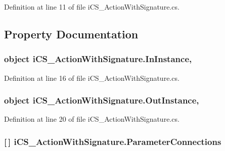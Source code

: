 Definition at line 11 of file i\+C\+S\+\_\+\+Action\+With\+Signature.\+cs.



\subsection{Property Documentation}
\hypertarget{classi_c_s___action_with_signature_a5197b643c6f412b39367e35d2d3ee346}{
\subsubsection[{In\+Instance}]{\setlength{\rightskip}{0pt plus 5cm}object i\+C\+S\+\_\+\+Action\+With\+Signature.\+In\+Instance\hspace{0.3cm}{\ttfamily [get]}, {\ttfamily [set]}}}\label{classi_c_s___action_with_signature_a5197b643c6f412b39367e35d2d3ee346}


Definition at line 16 of file i\+C\+S\+\_\+\+Action\+With\+Signature.\+cs.

\hypertarget{classi_c_s___action_with_signature_a04da5cdc43cc8a65dd2f21d4807144fe}{
\subsubsection[{Out\+Instance}]{\setlength{\rightskip}{0pt plus 5cm}object i\+C\+S\+\_\+\+Action\+With\+Signature.\+Out\+Instance\hspace{0.3cm}{\ttfamily [get]}, {\ttfamily [set]}}}\label{classi_c_s___action_with_signature_a04da5cdc43cc8a65dd2f21d4807144fe}


Definition at line 20 of file i\+C\+S\+\_\+\+Action\+With\+Signature.\+cs.

\hypertarget{classi_c_s___action_with_signature_aa5c7f65ab7536ce9bb086d16b1bdab20}{
\subsubsection[{Parameter\+Connections}]{ \mbox{[}$\,$\mbox{]} i\+C\+S\+\_\+\+Action\+With\+Signature.\+Parameter\+Connections\hspace{0.3cm}{\ttfamily [get]}}}\label{classi_c_s___action_with_signature_aa5c7f65ab7536ce9bb086d16b1bdab20}



